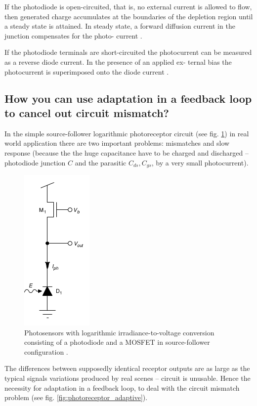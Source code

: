 \documentclass[main]{subfiles}
\begin{document}
If the photodiode is open-circuited, that is, no external current is allowed
to flow, then generated charge accumulates at the boundaries of the depletion
region until a steady state is attained. In steady state, a forward diffusion current in
the junction compensates for the photo-
current \cite{paper:photo}.

If the photodiode terminals are short-circuited the photocurrent
can be measured as a reverse diode current. In the presence of an applied ex-
ternal bias the photocurrent is superimposed onto the diode current \cite{book:VLSI}.



\subsection{How you can use adaptation in a feedback loop to cancel out circuit mismatch?}

In the simple source-follower logarithmic photoreceptor circuit (see fig. \ref{fig:photoreceptor_log}) in real world application there are two important problems: mismatches and slow response (because the the huge capacitance have to be charged and discharged -- photodiode junction $C$ and the parasitic $C_{ds}, C_{gs}$, by a very small photocurrent). 

\begin{figure}[htbp]
  \centering
  \includegraphics[scale=0.8]{figs/photoreceptor_log.jpg}
  \caption{Photosensors with logarithmic irradiance-to-voltage conversion consisting of a photodiode and a MOSFET in source-follower configuration \cite{book:VLSI}.}
  \label{fig:photoreceptor_log}
\end{figure} 

The differences between supposedly identical receptor outputs are as large as the typical signals
variations produced by real scenes -- circuit is unusable. Hence the necessity for adaptation in a feedback loop, to deal with the circuit mismatch problem (see fig. \ref{fig:photoreceptor_adaptive}).
\end{document}
